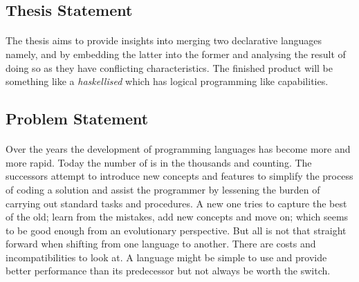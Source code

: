 \documentclass[proposal.tex]{subfiles}
\begin{document}
\subsection{Thesis Statement}
\paragraph{} 
The thesis aims to provide insights into merging two declarative languages namely,  and  by embedding 
the latter into the former and analysing the result of doing so as they have conflicting characteristics. The finished product will be 
something like a \textit{haskellised}  which has logical programming like capabilities.       


\subsection{Problem Statement}

\paragraph{}
Over the years the development of programming languages has become more and more rapid. Today the number of is in the thousands and counting. The 
successors attempt to introduce new concepts and features to simplify the process of coding a solution and assist the programmer by lessening the 
burden of carrying out standard tasks and procedures. A new one tries to capture the best of the old; learn from the mistakes, add new concepts and 
move on; which seems to be good enough from an evolutionary perspective. But all is not that straight forward when shifting from one language 
to another. There are costs and incompatibilities to look at. A language might be simple to use and provide better performance than its 
predecessor but not always be worth the switch.
\end{document}
